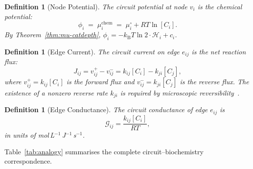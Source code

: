 \documentclass[twocolumn,10pt,a4paper]{article}
\newcommand{\kB}{k_{\mathrm{B}}}
\newcommand{\Hcat}{\mathcal{H}}
\newcommand{\Gcond}{\mathcal{G}}
\newtheorem{definition}[theorem]{Definition}
\begin{document}
\begin{definition}[Node Potential]
\label{def:potential}
The \emph{circuit potential} at node $v_i$ is the chemical potential:
\begin{equation}
  \phi_i \;=\; \mu_i^{\mathrm{chem}} \;=\; \mu_i^\circ + RT\ln[C_i].
  \label{eq:potential}
\end{equation}
By Theorem~\ref{thm:mu-catdepth},
$\phi_i = -\kB T\ln 2\cdot\Hcat_i + c_i$.
\end{definition}

\begin{definition}[Edge Current]
\label{def:current}
The \emph{circuit current} on edge $e_{ij}$ is the net reaction flux:
\begin{equation}
  J_{ij} = v_{ij}^+ - v_{ij}^- = k_{ij}[C_i] - k_{ji}[C_j],
  \label{eq:current}
\end{equation}
where $v_{ij}^+=k_{ij}[C_i]$ is the forward flux and
$v_{ij}^-=k_{ji}[C_j]$ is the reverse flux.  The existence of a nonzero
reverse rate $k_{ji}$ is required by microscopic
reversibility~\cite{Wegscheider1901,Lewis1925,Onsager1931}.
\end{definition}

\begin{definition}[Edge Conductance]
\label{def:conductance}
The \emph{circuit conductance} of edge $e_{ij}$ is
\begin{equation}
  \Gcond_{ij} = \frac{k_{ij}[C_i]}{RT},
  \label{eq:conductance}
\end{equation}
in units of mol\,L$^{-1}$\,J$^{-1}$\,s$^{-1}$.
\end{definition}

Table~\ref{tab:analogy} summarises the complete circuit--biochemistry
correspondence.
\end{document}

